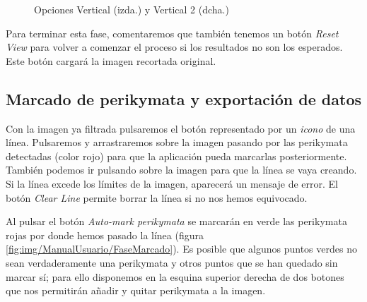 \begin{figure}[h]
\centering
{}
\caption[Opciones orientación de perikymata]{Opciones Vertical (izda.) y Vertical 2 (dcha.)}
\label{fig:PerikymataOrientation}
\end{figure}

Para terminar esta fase, comentaremos que también tenemos un botón \textit{Reset View} para volver a comenzar el proceso si los resultados no son los esperados. Este botón cargará la imagen recortada original.

\newpage
\subsection{Marcado de perikymata y exportación de datos}

Con la imagen ya filtrada pulsaremos el botón representado por un \textit{icono} de una línea. Pulsaremos y arrastraremos sobre la imagen pasando por las perikymata detectadas (color rojo) para que la aplicación pueda marcarlas posteriormente. También podemos ir pulsando sobre la imagen para que la línea se vaya creando. Si la línea excede los límites de la imagen, aparecerá un mensaje de error. El botón \textit{Clear Line} permite borrar la línea si no nos hemos equivocado.

Al pulsar el botón \textit{Auto-mark perikymata} se marcarán en verde las perikymata rojas por donde hemos pasado la línea (figura \ref{fig:img/ManualUsuario/FaseMarcado}). Es posible que algunos puntos verdes no sean verdaderamente una perikymata y otros puntos que se han quedado sin marcar sí; para ello disponemos en la esquina superior derecha de dos botones que nos permitirán añadir y quitar perikymata a la imagen. 

